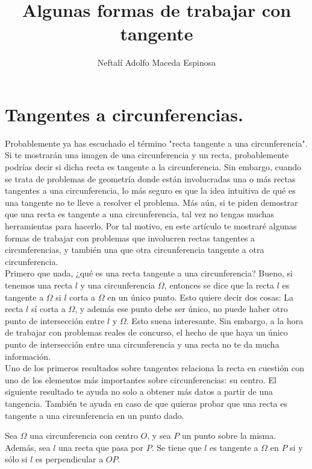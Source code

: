 \documentclass{article}
\title{Algunas formas de trabajar con tangente}
\author{Neftalí Adolfo Maceda Espinosa}
\begin{document}
\maketitle

\section*{Tangentes a circunferencias.}

Probablemente ya has escuchado el término "recta tangente a una 
circunferencia". Si te mostrarán una imagen de una circunferencia y un recta,
probablemente podrías decir si dicha recta es tangente a la circunferencia.
Sin embargo, cuando se trata de problemas de geometría donde están involucradas
una o más rectas tangentes a una circunferencia, lo más seguro es que la idea
intuitiva de qué es una tangente no te lleve a resolver el problema. Más aún,
si te piden demostrar que una recta es tangente a una circunferencia, tal vez
no tengas muchas herramientas para hacerlo. Por tal motivo, en este artículo
te mostraré algunas formas de trabajar con problemas que involucren rectas
tangentes a circunferencias, y también una que otra circunferencia tangente
a otra circunferencia.\\

Primero que nada, ¿qué es una recta tangente a una circunferencia? Bueno, si 
tenemos una recta $l$ y una circunferencia $\Omega$, entonces se dice que la
recta $l$ es tangente a $\Omega$ si $l$ corta a $\Omega$ en un único punto. 
Esto quiere decir dos cosas: La recta $l$ sí corta a $\Omega$, y además
ese punto debe ser único, no puede haber otro punto de intersección entre 
$l$ y $\Omega$. Esto suena interesante. Sin embargo, a la hora de trabajar
con problemas reales de concurso, el hecho de que haya un único punto de 
intersección entre una circunferencia y una recta no te da mucha información.\\

Uno de los primeros resultados sobre tangentes relaciona la recta en cuestión 
con uno de los elementos más importantes sobre circunferencias: su centro.
El siguiente resultado te ayuda no solo a obtener más datos a partir de una
tangencia. También te ayuda en caso de que quieras probar que una recta es
tangente a una circunferencia en un punto dado.

\newpage
\begin{lema}
    Sea $\Omega$ una circunferencia con centro $O$, y sea $P$ un punto
    sobre la misma. Además, sea $l$ una recta que pasa por $P$. Se tiene
    que $l$ es tangente a $\Omega$ en $P$ si y sólo si $l$ es perpendicular
    a $OP$.
\end{lema}
\end{document}
